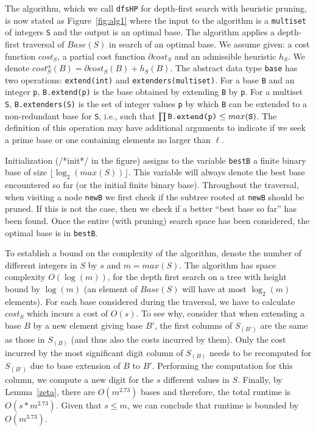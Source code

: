 \documentclass[envcountsame]{llncs}
\newcommand{\Base}{\mathit{Base}}
\newcommand{\cost}{\mathit{cost}}
\begin{document}
The algorithm, which we call \texttt{dfsHP} for depth-first search
with heuristic pruning, is now stated as Figure~\ref{fig:alg1} where
the input to the algorithm is a \texttt{multiset} of integers
\texttt{S} and the output is an optimal base. The algorithm applies a
depth-first traversal of $\Base(S)$ in search of an optimal base.
We assume given: a cost function $\cost_S$, a partial cost function
$\partial \cost_S$ and an admissible heuristic $h_S$. We denote
$\cost^\alpha_S(B)=\partial \cost_S(B) + h_S(B)$.
The abstract data type \texttt{base} has two operations:
\texttt{extend(int)} and \texttt{extenders(multiset)}. For a base
\texttt{B} and an integer \texttt{p}, \texttt{B.extend(p)} is the base
obtained by extending \texttt{B} by \texttt{p}. For a multiset
\texttt{S}, \texttt{B.extenders(S)} is the set of integer values
\texttt{p} by which \texttt{B} can be extended to a non-redundant base
for \texttt{S}, i.e., such that $\prod \mbox{\texttt{B.extend(p)}}\leq
max(\mbox{\texttt{S}})$.  The definition of this operation may have
additional arguments to indicate if we seek a prime base or one
containing elements no larger than $\ell$.

Initialization ({\scriptsize /*init*/} in the figure) assigns to the
variable \texttt{bestB} a finite binary base of size
$\lfloor\log_2(max(S))\rfloor$. This variable will always denote the
best base encountered so far (or the initial finite binary base).
Throughout the traversal, when visiting a node \texttt{newB} we first
check if the subtree rooted at \texttt{newB} should be pruned. If this
is not the case, then we check if a better ``best base so far'' has
been found. Once the entire (with pruning) search space has been
considered, the optimal base is in \texttt{bestB}.

To establish a bound on the complexity of the algorithm,  denote
the number of different integers in $S$ by $s$ and $m=max(S)$.  
The algorithm has space complexity $O(\log(m))$, for the depth first
search on a tree with height bound by $\log(m)$ (an element of
$\Base(S)$ will have at most $\log_2(m)$ elements).
For each base considered during the traversal, we have to calculate
$cost_S$ which incurs a cost of $O(s)$.  To see why, consider that
when extending a base $B$ by a new element giving base $B'$, the first
columns of $S_{(B')}$ are the same as those in $S_{(B)}$ (and thus
also the costs incurred by them). Only the cost incurred by the most
significant digit column of $S_{(B)}$ needs to be recomputed for
$S_{(B')}$ due to base extension of $B$ to $B'$. 
Performing the
computation for this column, we compute a new digit for the $s$
different values in $S$.
Finally, by Lemma~\ref{zeta}, there are $O(m^{2.73})$ bases and
therefore, the total runtime is $O(s*m^{2.73})$. Given that $s\leq m$,
we can conclude that runtime is bounded by $O(m^{3.73})$.
\end{document}
